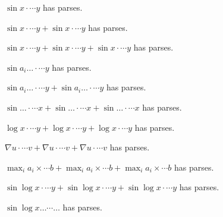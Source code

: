 \documentclass{article}
\makeatletter
\newcommand{\countparses}{\ltx@count@parses}
\makeatother
\begin{document}
$\sin x\cdot\cdots y$ has \countparses{} parses.

$\sin x\cdot\cdots y+\sin x\cdot\cdots y$ has \countparses{} parses.

$\sin x\cdot\cdots y+\sin x\cdot\cdots y+\sin x\cdot\cdots y$ has \countparses{} parses.

$\sin a_i\ldots\cdot\cdots y$ has \countparses{} parses.

$\sin a_i\ldots\cdot\cdots y+\sin a_i\ldots\cdot\cdots y$ has \countparses{} parses.

$\sin\ldots\cdot\cdots x+\sin\ldots\cdot\cdots x+\sin\ldots\cdot\cdots x$ has \countparses{} parses.

$\log x\cdot\cdots y+\log x\cdot\cdots y+\log x\cdot\cdots y$ has \countparses{} parses.

$\nabla u\cdot\cdots v+\nabla u\cdot\cdots v+\nabla u\cdot\cdots v$ has \countparses{} parses.

$\max_i a_i\times\cdots b+\max_i a_i\times\cdots b+\max_i a_i\times\cdots b$ has \countparses{} parses.

$\sin\log x\cdot\cdots y+\sin\log x\cdot\cdots y+\sin\log x\cdot\cdots y$ has \countparses{} parses.

$\sin\log x\ldots\cdots\ldots$ has \countparses{} parses.
\end{document}
